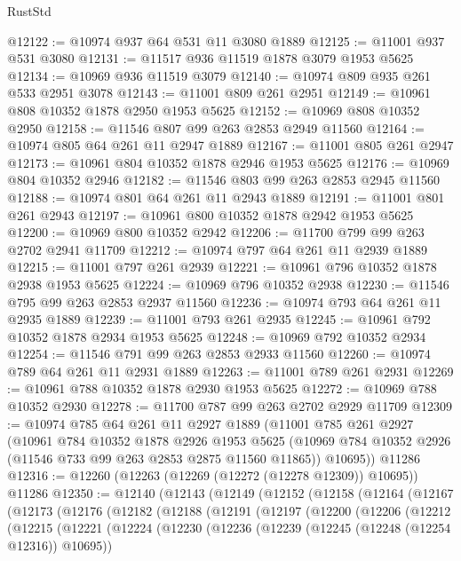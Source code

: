 \begin{lexlean}{RustStd}
\begin{coremodule}
@12122 := @10974 @937 @64 @531 @11 @3080 @1889
@12125 := @11001 @937 @531 @3080
@12131 := @11517 @936 @11519 @1878 @3079 @1953 @5625
@12134 := @10969 @936 @11519 @3079
@12140 := @10974 @809 @935 @261 @533 @2951 @3078
@12143 := @11001 @809 @261 @2951
@12149 := @10961 @808 @10352 @1878 @2950 @1953 @5625
@12152 := @10969 @808 @10352 @2950
@12158 := @11546 @807 @99 @263 @2853 @2949 @11560
@12164 := @10974 @805 @64 @261 @11 @2947 @1889
@12167 := @11001 @805 @261 @2947
@12173 := @10961 @804 @10352 @1878 @2946 @1953 @5625
@12176 := @10969 @804 @10352 @2946
@12182 := @11546 @803 @99 @263 @2853 @2945 @11560
@12188 := @10974 @801 @64 @261 @11 @2943 @1889
@12191 := @11001 @801 @261 @2943
@12197 := @10961 @800 @10352 @1878 @2942 @1953 @5625
@12200 := @10969 @800 @10352 @2942
@12206 := @11700 @799 @99 @263 @2702 @2941 @11709
@12212 := @10974 @797 @64 @261 @11 @2939 @1889
@12215 := @11001 @797 @261 @2939
@12221 := @10961 @796 @10352 @1878 @2938 @1953 @5625
@12224 := @10969 @796 @10352 @2938
@12230 := @11546 @795 @99 @263 @2853 @2937 @11560
@12236 := @10974 @793 @64 @261 @11 @2935 @1889
@12239 := @11001 @793 @261 @2935
@12245 := @10961 @792 @10352 @1878 @2934 @1953 @5625
@12248 := @10969 @792 @10352 @2934
@12254 := @11546 @791 @99 @263 @2853 @2933 @11560
@12260 := @10974 @789 @64 @261 @11 @2931 @1889
@12263 := @11001 @789 @261 @2931
@12269 := @10961 @788 @10352 @1878 @2930 @1953 @5625
@12272 := @10969 @788 @10352 @2930
@12278 := @11700 @787 @99 @263 @2702 @2929 @11709
@12309 := @10974
    @785
    @64
    @261
    @11
    @2927
    @1889
    (@11001
      @785
      @261
      @2927
      (@10961
        @784
        @10352
        @1878
        @2926
        @1953
        @5625
        (@10969 @784 @10352 @2926 (@11546 @733 @99 @263 @2853 @2875 @11560 @11865))
        @10695))
    @11286
@12316 := @12260 (@12263 (@12269 (@12272 (@12278 @12309)) @10695)) @11286
@12350 := @12140
    (@12143
      (@12149
        (@12152
          (@12158
            (@12164
              (@12167
                (@12173
                  (@12176
                    (@12182
                      (@12188
                        (@12191
                          (@12197
                            (@12200
                              (@12206
                                (@12212
                                  (@12215
                                    (@12221
                                      (@12224
                                        (@12230
                                          (@12236
                                            (@12239 (@12245 (@12248 (@12254 @12316)) @10695))

\end{coremodule}
\end{lexlean}
